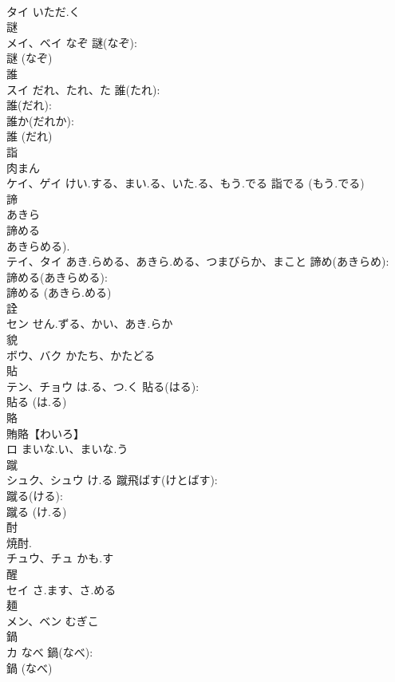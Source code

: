 \documentclass[8pt]{extreport}
\begin{document}
\begin{CJK}{UTF8}{min}
\\	タイ	いただ.く		
\\	謎			
\\	メイ、ベイ	なぞ	謎(なぞ): 
\\	謎 (なぞ)
\\	誰			
\\	スイ	だれ、たれ、た	誰(たれ): 
\\	誰(だれ): 
\\	誰か(だれか): 
\\	誰 (だれ)
\\	詣			
\\	肉まん 
\\	ケイ、ゲイ	けい.する、まい.る、いた.る、もう.でる		詣でる (もう.でる)
\\	諦			
\\	あきら 
\\	諦める 
\\	あきらめる).	
\\	テイ、タイ	あき.らめる、あきら.める、つまびらか、まこと	諦め(あきらめ): 
\\	諦める(あきらめる): 
\\	諦める (あきら.める)
\\	詮			
\\	セン	せん.ずる、かい、あき.らか		
\\	貌			
\\	ボウ、バク	かたち、かたどる		
\\	貼			
\\	テン、チョウ	は.る、つ.く	貼る(はる): 
\\	貼る (は.る)
\\	賂			
\\	賄賂【わいろ】 
\\	ロ	まいな.い、まいな.う		
\\	蹴			
\\	シュク、シュウ	け.る	蹴飛ばす(けとばす): 
\\	蹴る(ける): 
\\	蹴る (け.る)
\\	酎			
\\	焼酎. 
\\	チュウ、チュ	かも.す		
\\	醒			
\\	セイ	さ.ます、さ.める		
\\	麺			
\\	メン、ベン	むぎこ		
\\	鍋			
\\	カ	なべ	鍋(なべ): 
\\	鍋 (なべ)

\end{CJK}
\end{document}
